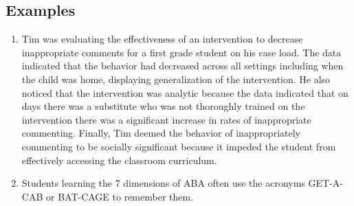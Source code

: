 \subsection{Examples}
\begin{enumerate}
\item Tim was evaluating the effectiveness of an intervention to decrease inappropriate comments for a first grade student on his case load. The data indicated that the behavior had decreased across all settings including when the child was home, displaying generalization of the intervention. He also noticed that the intervention was analytic because the data indicated that on days there was a substitute who was not thoroughly trained on the intervention there was a significant increase in rates of inappropriate commenting. Finally, Tim deemed the behavior of inappropriately commenting to be socially significant because it impeded the student from effectively accessing the classroom curriculum. 
\item Students learning the 7 dimensions of ABA often use the acronyms GET-A-CAB or BAT-CAGE to remember them.
\end{enumerate}
%
